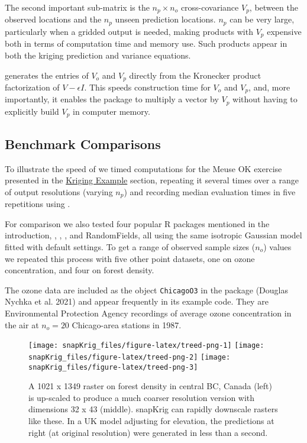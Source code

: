 The second important sub-matrix is the \(n_p \times n_o\) cross-covariance \(V_p\), between the observed locations and the \(n_p\) unseen prediction locations. \(n_p\) can be very large, particularly when a gridded output is needed, making products with \(V_p\) expensive both in terms of computation time and memory use. Such products appear in both the kriging prediction and variance equations.

 generates the entries of \(V_o\) and \(V_p\) directly from the Kronecker product factorization of \(V - \epsilon I\). This speeds construction time for \(V_o\) and \(V_p\), and, more importantly, it enables the package to multiply a vector by \(V_p\) without having to explicitly build \(V_p\) in computer memory.

\hypertarget{benchmark-comparisons}{%
\subsection{Benchmark Comparisons}\label{benchmark-comparisons}}

To illustrate the speed of  we timed computations for the Meuse OK exercise presented in the \protect\hyperlink{kriging-example}{Kriging Example} section, repeating it several times over a range of output resolutions (varying \(n_p\)) and recording median evaluation times in five repetitions using .

For comparison we also tested four popular R packages mentioned in the introduction, , , , and RandomFields, all using the same isotropic Gaussian model fitted with default settings. To get a range of observed sample sizes (\(n_o\)) values we repeated this process with five other point datasets, one on ozone concentration, and four on forest density.

The ozone data are included as the object \texttt{ChicagoO3} in the  package (Douglas Nychka et al. 2021) and appear frequently in its example code. They are Environmental Protection Agency recordings of average ozone concentration in the air at \(n_o=20\) Chicago-area stations in 1987.

\begin{figure}[htb]
\texttt{[image: snapKrig\_files/figure-latex/treed-png-1]} \texttt{[image: snapKrig\_files/figure-latex/treed-png-2]} \texttt{[image: snapKrig\_files/figure-latex/treed-png-3]} \caption{A 1021 x 1349 raster on forest density in central BC, Canada (left) is up-scaled to produce a much coarser resolution version with dimensions 32 x 43 (middle). snapKrig can rapidly downscale rasters like these. In a UK model adjusting for elevation, the predictions at right (at original resolution) were generated in less than a second.}\label{fig:treed-png}
\end{figure}

